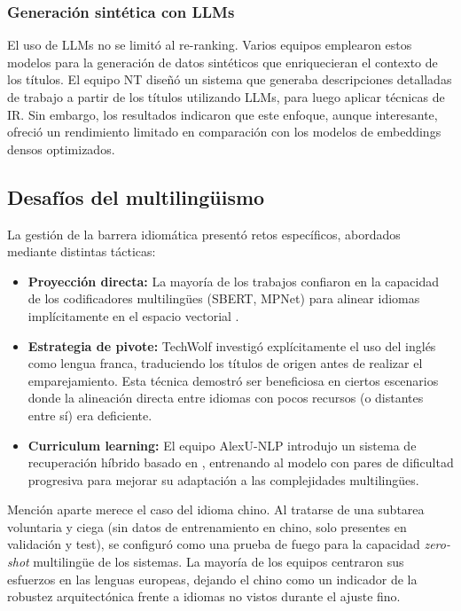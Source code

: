 \subsubsection{Generación sintética con LLMs}

\noindent El uso de \gls{LLM}s no se limitó al re-ranking. Varios equipos emplearon estos modelos para la generación de datos sintéticos que enriquecieran el contexto de los títulos. El equipo NT \cite{nga2025nt} diseñó un sistema que generaba descripciones detalladas de trabajo a partir de los títulos utilizando \gls{LLM}s, para luego aplicar técnicas de \gls{IR}. Sin embargo, los resultados indicaron que este enfoque, aunque interesante, ofreció un rendimiento limitado en comparación con los modelos de embeddings densos optimizados.

\subsection{Desafíos del multilingüismo}

\noindent La gestión de la barrera idiomática presentó retos específicos, abordados mediante distintas tácticas:

\begin{itemize}
    \item \textbf{Proyección directa:} La mayoría de los trabajos confiaron en la capacidad de los codificadores multilingües (SBERT, MPNet) para alinear idiomas implícitamente en el espacio vectorial \cite{brikman2025multilingual,nizami2025enhancing,novoa2025verbanex}.
    \item \textbf{Estrategia de pivote:} TechWolf \cite{rodriguez2025two} investigó explícitamente el uso del inglés como lengua franca, traduciendo los títulos de origen antes de realizar el emparejamiento. Esta técnica demostró ser beneficiosa en ciertos escenarios donde la alineación directa entre idiomas con pocos recursos (o distantes entre sí) era deficiente.
    \item \textbf{Curriculum learning:} El equipo AlexU-NLP \cite{barakat2025alexu} introdujo un sistema de recuperación híbrido basado en , entrenando al modelo con pares de dificultad progresiva para mejorar su adaptación a las complejidades multilingües.
\end{itemize}

Mención aparte merece el caso del idioma chino. Al tratarse de una subtarea voluntaria y ciega (sin datos de entrenamiento en chino, solo presentes en validación y test), se configuró como una prueba de fuego para la capacidad \textit{zero-shot} multilingüe de los sistemas. La mayoría de los equipos centraron sus esfuerzos en las lenguas europeas, dejando el chino como un indicador de la robustez arquitectónica frente a idiomas no vistos durante el ajuste fino.

